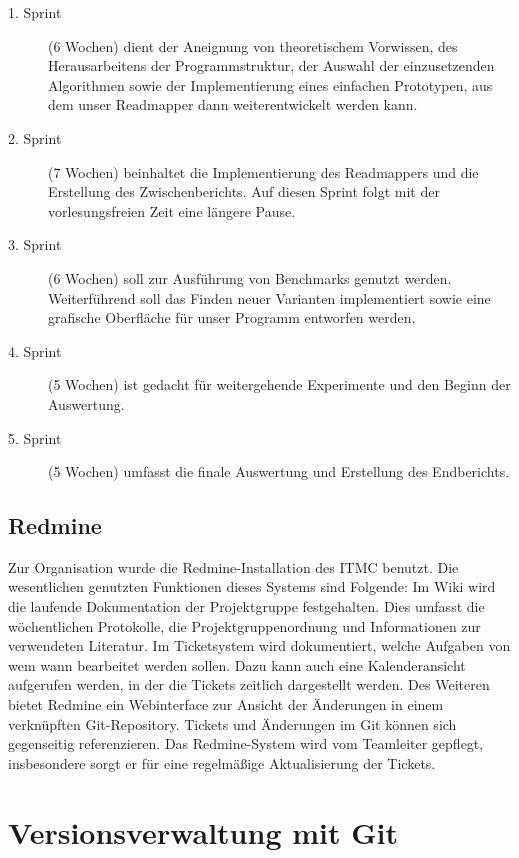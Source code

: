 \begin{description}
  \item[1. Sprint] (6 Wochen) dient der Aneignung von theoretischem Vorwissen, des
    Herausarbeitens der Programmstruktur, der Auswahl der einzusetzenden Algorithmen
    sowie der Implementierung eines einfachen Prototypen, aus dem
    unser Readmapper dann weiterentwickelt werden kann.
  \item[2. Sprint] (7 Wochen) beinhaltet die Implementierung des Readmappers und die
    Erstellung des Zwischenberichts. Auf diesen Sprint folgt mit der
    vorlesungsfreien Zeit eine längere Pause.
  \item[3. Sprint] (6 Wochen) soll zur Ausführung von Benchmarks genutzt werden.
    Weiterführend soll das
    Finden neuer Varianten implementiert sowie eine grafische Oberfläche für
    unser Programm entworfen werden.
  \item[4. Sprint] (5 Wochen) ist gedacht für weitergehende Experimente und den
    Beginn der Auswertung.
  \item[5. Sprint] (5 Wochen) umfasst die finale Auswertung und Erstellung des Endberichts.
\end{description}

\subsection{Redmine}
\label{sec:orga:projekt:redmine}

Zur Organisation wurde die Redmine-Installation des ITMC benutzt. Die
wesentlichen genutzten Funktionen dieses Systems sind Folgende: Im Wiki wird die
laufende Dokumentation der Projektgruppe festgehalten. Dies umfasst die
wöchentlichen Protokolle, die Projektgruppenordnung und Informationen zur
verwendeten Literatur. Im Ticketsystem wird dokumentiert, welche Aufgaben von
wem wann bearbeitet werden sollen. Dazu kann auch eine Kalenderansicht
aufgerufen werden, in der die Tickets zeitlich dargestellt werden. Des Weiteren
bietet Redmine ein Webinterface zur Ansicht der Änderungen in einem verknüpften
Git-Repository. Tickets und Änderungen im Git können sich gegenseitig
referenzieren. Das Redmine-System wird vom Teamleiter gepflegt, insbesondere
sorgt er für eine regelmäßige Aktualisierung der Tickets.

\section{Versionsverwaltung mit Git}
\label{sec:orga:vers}
\label{sec:orga:vers:git}

